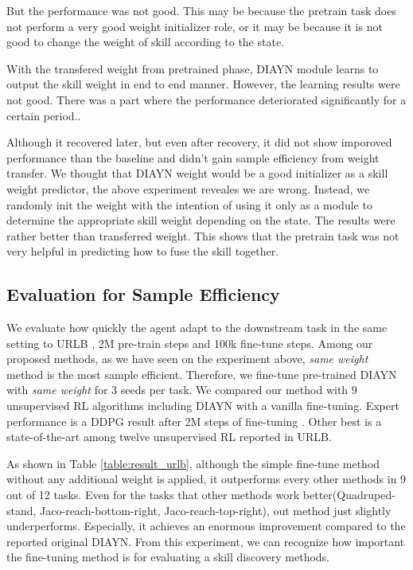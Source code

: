  But the performance was not good. This may be because the pretrain task does not perform a very good weight initializer role,
 or it may be because it is not good to change the weight of skill according to the state.

With the transfered weight from pretrained phase, DIAYN module learns to output the skill weight in end to end manner.
However, the learning results were not good.
There was a part where the performance deteriorated significantly for a certain period..

Although it recovered later, but even after recovery, it did not show imporoved performance than the baseline and didn't gain sample efficiency from weight transfer.
We thought that DIAYN weight would be a good initializer as a skill weight predictor, the above experiment reveales we are wrong.
Instead, we randomly init the weight with the intention of using it only as a module to determine the appropriate skill weight depending on the state.
The results were rather better than transferred weight.
This shows that the pretrain task was not very helpful in predicting how to fuse the skill together.

\subsection{Evaluation for Sample Efficiency}
We evaluate how quickly the agent adapt to the downstream task in the same setting to URLB \cite{laskin2021urlb}, 2M pre-train steps and 100k fine-tune steps.
Among our proposed methods, as we have seen on the experiment above, \emph{same weight} method is the most sample efficient.
Therefore, we fine-tune pre-trained DIAYN with \emph{same weight}  for 3 seeds per task.
We compared our method with 9 unsupervised RL algorithms including DIAYN with a vanilla fine-tuning.
Expert performance is a DDPG result after 2M steps of fine-tuning \cite{laskin2022cic}.
Other best is a state-of-the-art among twelve unsupervised RL reported in URLB.

As shown in Table \ref{table:result_urlb}, although the simple fine-tune method without any additional weight is applied,
it outperforms every other methods in 9 out of 12 tasks.
Even for the tasks that other methods work better(Quadruped-stand, Jaco-reach-bottom-right, Jaco-reach-top-right),
out method just slightly underperforms.
Especially, it achieves an enormous improvement compared to the reported original DIAYN.
From this experiment, we can recognize how important the fine-tuning method is for
evaluating a skill discovery methods.


